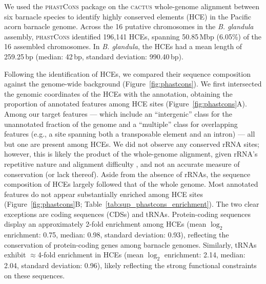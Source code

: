 We used the \textsc{phastCons} package \citep{siepel_evolutionarily_2005} on the
\textsc{cactus} whole-genome alignment \citep{armstrong_progressive_2020} between
six barnacle species to identify highly conserved elements (HCE) in the Pacific
acorn barnacle genome.
Across the 16 putative chromosomes in the \textit{B. glandula} assembly, \textsc{phastCons}
identified 196{,}141 HCEs, spanning 50.85\,Mbp (6.05\%) of the 16 assembled chromosomes.
In \textit{B. glandula}, the HCEs had a mean length of 259.25\,bp (median: 42\,bp,
standard deviation: 990.40\,bp).
\vspace{0.1cm}

Following the identification of HCEs, we compared their sequence composition against
the genome-wide background (Figure~\ref{fig:phastcons}).
We first intersected the genomic coordinates of the HCEs with the \bgla{}
annotation, obtaining the proportion of annotated features among HCE sites
(Figure~\ref{fig:phastcons}A). Among our target features — which include an
``intergenic'' class for the unannotated fraction of the genome and a ``multiple''
class for overlapping features (e.g., a site spanning both a transposable element
and an intron) — all but one are present among HCEs. We did not observe any conserved
rRNA sites; however, this is likely the product of the whole-genome alignment, given
rRNA's repetitive nature and alignment difficulty \citep{gillespie_characterizing_2004},
and not an accurate measure of conservation (or lack thereof).
Aside from the absence of rRNAs, the sequence composition of HCEs largely followed that
of the whole genome.
Most annotated features do not appear substantially enriched among HCE sites
(Figure~\ref{fig:phastcons}B; Table~\ref{tab:sup_phastcons_enrichment}).
The two clear exceptions are coding sequences (CDSs) and tRNAs.
Protein-coding sequences display an approximately 2-fold enrichment among HCEs (mean
$\log_2$ enrichment: 0.75, median: 0.98, standard deviation: 0.93), reflecting the
conservation of protein-coding genes among barnacle genomes.
Similarly, tRNAs exhibit $\approx$4-fold enrichment in HCEs (mean $\log_2$ enrichment:
2.14, median: 2.04, standard deviation: 0.96), likely reflecting the strong functional
constraints on these sequences.
\vspace{0.1cm}

